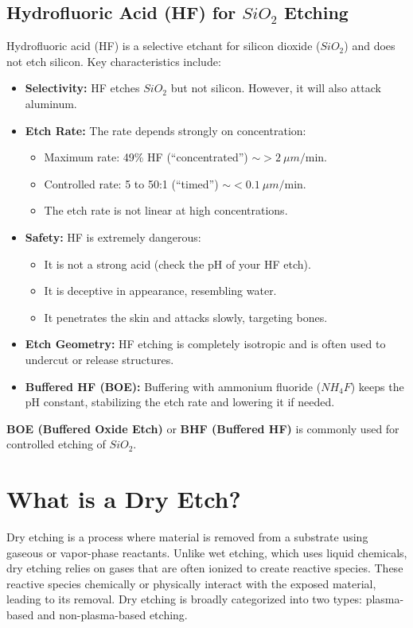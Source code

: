 \documentclass{report}
\begin{document}
\subsection{Hydrofluoric Acid (HF) for $SiO_{2}$ Etching}
Hydrofluoric acid (HF) is a selective etchant for silicon dioxide ($SiO_{2}$) and does not etch silicon. Key characteristics include:
\begin{itemize}
    \item \textbf{Selectivity:} HF etches $SiO_{2}$ but not silicon. However, it will also attack aluminum.
    \item \textbf{Etch Rate:} The rate depends strongly on concentration:
    \begin{itemize}
        \item Maximum rate: 49\% HF (“concentrated”) $\sim>2~\mu m/\text{min}$.
        \item Controlled rate: 5 to 50:1 (“timed”) $\sim<0.1~\mu m/\text{min}$.
        \item The etch rate is not linear at high concentrations.
    \end{itemize}
    \item \textbf{Safety:} HF is extremely dangerous:
    \begin{itemize}
        \item It is not a strong acid (check the pH of your HF etch).
        \item It is deceptive in appearance, resembling water.
        \item It penetrates the skin and attacks slowly, targeting bones.
    \end{itemize}
    \item \textbf{Etch Geometry:} HF etching is completely isotropic and is often used to undercut or release structures.
    \item \textbf{Buffered HF (BOE):} Buffering with ammonium fluoride ($NH_{4}F$) keeps the pH constant, stabilizing the etch rate and lowering it if needed.
\end{itemize}
\textbf{BOE (Buffered Oxide Etch)} or \textbf{BHF (Buffered HF)} is commonly used for controlled etching of $SiO_{2}$.

\section{What is a Dry Etch?}
Dry etching is a process where material is removed from a substrate using gaseous or vapor-phase reactants. Unlike wet etching, which uses liquid chemicals, dry etching relies on gases that are often ionized to create reactive species. These reactive species chemically or physically interact with the exposed material, leading to its removal. Dry etching is broadly categorized into two types: plasma-based and non-plasma-based etching.
\end{document}

